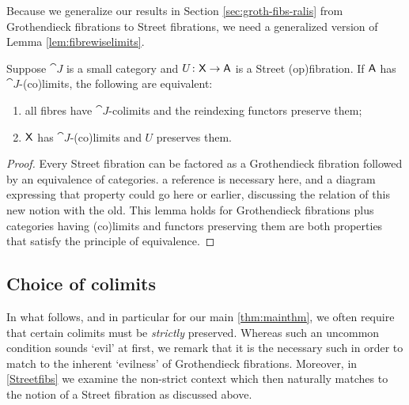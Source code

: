 \documentclass{amsart}
\begin{document}
Because we generalize our results in Section
\ref{sec:groth-fibs-ralis} from Grothendieck fibrations to
Street fibrations, we need a generalized version of Lemma
\ref{lem:fibrewiselimits}.

\begin{lem} \label{lem:street-fibrewise-limits}
  Suppose $ \cat{J} $ is a small category and $ U \colon \mathsf{X}
  \to \mathsf{A} $ is a Street (op)fibration. If $ \mathsf{A} $ has $ \cat{J}
  $-(co)limits, the following are equivalent:
  \begin{enumerate}
  \item
    all fibres have $ \cat{J} $-colimits and the
    reindexing functors preserve them;
  \item
    $ \mathsf{X} $ has $ \cat{J} $-(co)limits and $ U $ preserves
    them.
  \end{enumerate}
\end{lem}

\begin{proof}
  Every Street fibration can be factored as a Grothendieck
  fibration followed by an equivalence of categories. {\chris a reference is necessary here, and a diagram expressing that property could go here or earlier, discussing the relation of this new notion with the old.} This
  lemma holds for Grothendieck fibrations plus categories having
  (co)limits and functors preserving them are both properties
  that satisfy the principle of equivalence.   
\end{proof}

\subsection*{Choice of colimits}

In what follows, and in particular for our main \cref{thm:mainthm}, we often require that certain colimits must be \emph{strictly} preserved. Whereas such an uncommon condition sounds `evil' at first, we remark that it is the necessary such in order to match to the inherent `evilness' of Grothendieck fibrations. Moreover, in \cref{Streetfibs} we examine the non-strict context which then naturally matches to the notion of a Street fibration as discussed above.
\end{document}
